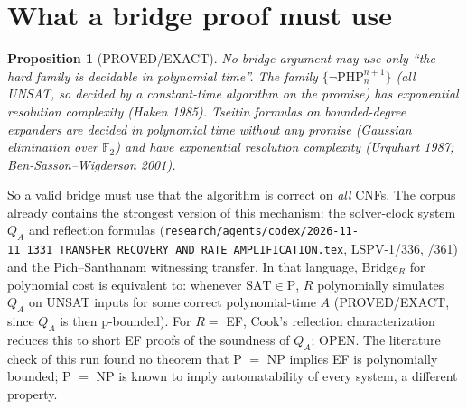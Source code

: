 \documentclass[11pt]{article}
\newtheorem{proposition}[theorem]{Proposition}
\newcommand{\SAT}{\mathrm{SAT}}
\begin{document}
\section{What a bridge proof must use}
\begin{proposition}[PROVED/EXACT]\label{prop:global}
No bridge argument may use only ``the hard family is decidable in polynomial
time''. The family $\{\neg\mathrm{PHP}^{n+1}_n\}$ (all UNSAT, so decided by a
constant-time algorithm on the promise) has exponential
resolution complexity (Haken 1985). Tseitin formulas on bounded-degree
expanders are decided in polynomial time without any promise (Gaussian
elimination over $\mathbb F_2$) and have exponential resolution complexity
(Urquhart 1987; Ben-Sasson--Wigderson 2001).
\end{proposition}
So a valid bridge must use that the algorithm is correct on \emph{all} CNFs.
The corpus already contains the strongest version of this mechanism: the
solver-clock system $Q_A$ and reflection formulas
(\texttt{research/agents/codex/2026-11-11\_1331\_TRANSFER\_RECOVERY\_AND\_RATE\_AMPLIFICATION.tex},
LSPV-1/336, /361) and the Pich--Santhanam witnessing transfer. In that
language, Bridge$_R$ for polynomial cost is equivalent to: whenever
$\SAT\in\mathrm P$, $R$ polynomially simulates $Q_A$ on UNSAT inputs for
some correct polynomial-time $A$ (PROVED/EXACT, since $Q_A$ is then
p-bounded). For $R=$ EF, Cook's reflection characterization reduces this to
short EF proofs of the soundness of $Q_A$; OPEN. The literature check of
this run found no theorem that P $=$ NP implies EF is polynomially bounded;
P $=$ NP is known to imply automatability of every system, a different
property.
\end{document}
